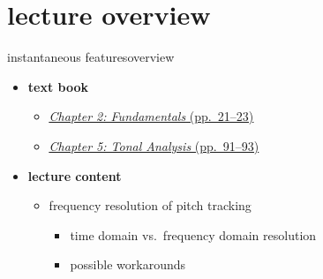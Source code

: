 

\subtitle{Part 6.2: Frequency Resolution of Pitch Tracking Solutions}


	

    \section[overview]{lecture overview}
        \begin{frame}{instantaneous features}{overview}
            \begin{itemize}
                \item   \textbf{text book}  
                    \begin{itemize}
                        \item   \href{http://ieeexplore.ieee.org/xpl/articleDetails.jsp?tp=&arnumber=6331119&}{\underline{\textit{Chapter 2: Fundamentals} (pp.~21--23)}}
                        \item   \href{http://ieeexplore.ieee.org/xpl/articleDetails.jsp?tp=&arnumber=6331122&}{\underline{\textit{Chapter 5: Tonal Analysis} (pp.~91--93)}}
                    \end{itemize}
                \bigskip
                \item<2->   \textbf{lecture content}
                    \begin{itemize}
                        \item<2->   frequency resolution of pitch tracking
                            \begin{itemize}
                                \item   time domain vs.\ frequency domain resolution
                                \item   possible workarounds
                            \end{itemize}
                    \end{itemize}
            \end{itemize}
        \end{frame}

